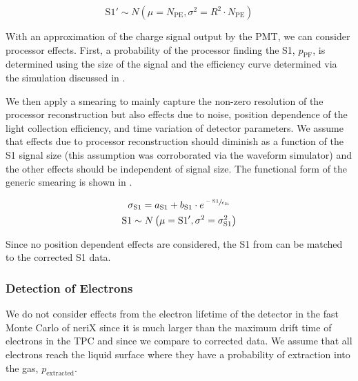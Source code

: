 \begin{equation}
        \textrm{S1}' \sim N \left( \mu=N_{\textrm{PE}}, \sigma^2=R^2 \cdot N_{\textrm{PE}} \right)
\end{equation}

With an approximation of the charge signal output by the PMT, we can consider processor effects.  First, a probability of the processor finding the S1, $p_{\textrm{PF}}$,  is determined using the size of the signal and the efficiency curve determined via the simulation discussed in .    

We then apply a smearing to mainly capture the non-zero resolution of the processor reconstruction but also effects due to noise, position dependence of the light collection efficiency, and time variation of detector parameters.  We assume that effects due to processor reconstruction should diminish as a function of the S1 signal size (this assumption was corroborated via the waveform simulator) and the other effects should be independent of signal size.  The functional form of the generic smearing is shown in .


\begin{equation}
        \label{eqn:nerix_s1_smearing}
        \begin{gathered}
                \sigma_{\textrm{S1}} = a_{\textrm{S1}} + b_{\textrm{S1}} \cdot e^{\sfrac{-\textrm{S1}}{c_{\textrm{S1}}}} \\
                \textrm{S1} \sim N \left( \mu = \textrm{S1}', \sigma^2  = \sigma_{\textrm{S1}}^2 \right)
        \end{gathered}
\end{equation}

Since no position dependent effects are considered, the S1 from  can be matched to the corrected S1 data.


\subsubsection{Detection of Electrons}


We do not consider effects from the electron lifetime of the detector in the fast Monte Carlo of neriX since it is much larger than the maximum drift time of electrons in the TPC and since we compare to corrected data.  We assume that all electrons reach the liquid surface where they have a probability of extraction into the gas, $p_{\textrm{extracted}}$.


